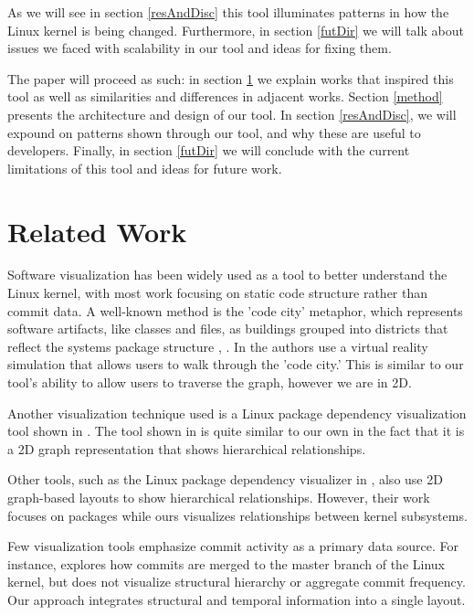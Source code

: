 \documentclass[conference]{IEEEtran}
\begin{document}

As we will see in section \ref{resAndDisc} this tool illuminates patterns in how the Linux kernel is being changed. Furthermore, in section \ref{futDir} we will talk about issues we faced with scalability in our tool and ideas for fixing them.

The paper will proceed as such: in section \ref{relWork} we explain works that inspired this tool as well as similarities and differences in adjacent works. Section \ref{method} presents the architecture and design of our tool. In section \ref{resAndDisc}, we will expound on patterns shown through our tool, and why these are useful to developers. Finally, in section \ref{futDir} we will conclude with the current limitations of this tool and ideas for future work.




\section{Related Work}
\label{relWork}


Software visualization has been widely used as a tool to better understand the Linux kernel, with most work focusing on static code structure rather than commit data. A well-known method is the 'code city' metaphor, which represents software artifacts, like classes and files, as buildings grouped into districts that reflect the systems package structure \cite{cityVR}, \cite{city}. In \cite{cityVR} the authors use a virtual reality simulation that allows users to walk through the 'code city.' This is similar to our tool's ability to allow users to traverse the graph, however we are in 2D. 

Another visualization technique used is a Linux package dependency visualization tool shown in \cite{mithun}. The tool shown in \cite{mithun} is quite similar to our own in the fact that it is a 2D graph representation that shows hierarchical relationships.

Other tools, such as the Linux package dependency visualizer in \cite{mithun}, also use 2D graph-based layouts to show hierarchical relationships. However, their work focuses on packages while ours visualizes relationships between kernel subsystems. 

Few visualization tools emphasize commit activity as a primary data source. For instance, \cite{merge} explores how commits are merged to the master branch of the Linux kernel, but does not visualize structural hierarchy or aggregate commit frequency. Our approach integrates structural and temporal information into a single layout.
\end{document}
